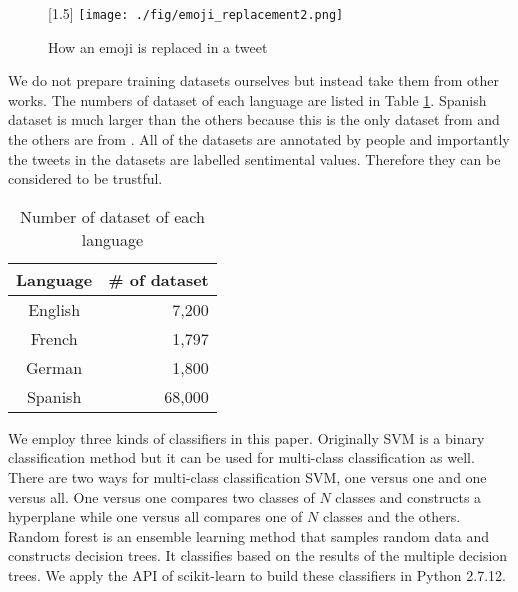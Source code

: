 \documentclass[twocolumn]{article}
\begin{document}
\begin{figure}
	\centering
	\scalebox{1.5}[1.5]{
	\texttt{[image: ./fig/emoji\_replacement2.png]}
	}
	\caption{How an emoji is replaced in a tweet}
	\label{fig:emoji_replacement}
\end{figure}

We do not prepare training datasets ourselves but instead take them from other works.
The numbers of dataset of each language are listed in Table \ref{tab:dataset}.
Spanish dataset is much larger than the others because this is the only dataset from \cite{dataset_spanish} and the others are from \cite{dataset}.
All of the datasets are annotated by people and importantly the tweets in the datasets are labelled sentimental values.
Therefore they can be considered to be trustful.

\begin{table}[ht]
	\caption{Number of dataset of each language}
	\centering
	\begin{tabular}{|c|r|} \hline
	Language & \# of dataset \\ \hline \hline
	English & 7,200  \\ \hline
	French & 1,797  \\ \hline
	German & 1,800  \\ \hline
	Spanish & 68,000  \\ \hline
	\end{tabular}
	\label{tab:dataset}
\end{table}

We employ three kinds of classifiers in this paper.
Originally SVM is a binary classification method but it can be used for multi-class classification as well.
There are two ways for multi-class classification SVM, one versus one and one versus all.
One versus one compares two classes of $N$ classes and constructs a hyperplane while one versus all compares one of $N$ classes and the others.
Random forest is an ensemble learning method that samples random data and constructs decision trees.
It classifies based on the results of the multiple decision trees. 
We apply the API of scikit-learn \cite{scikit} to build these classifiers in Python 2.7.12.
\end{document}
